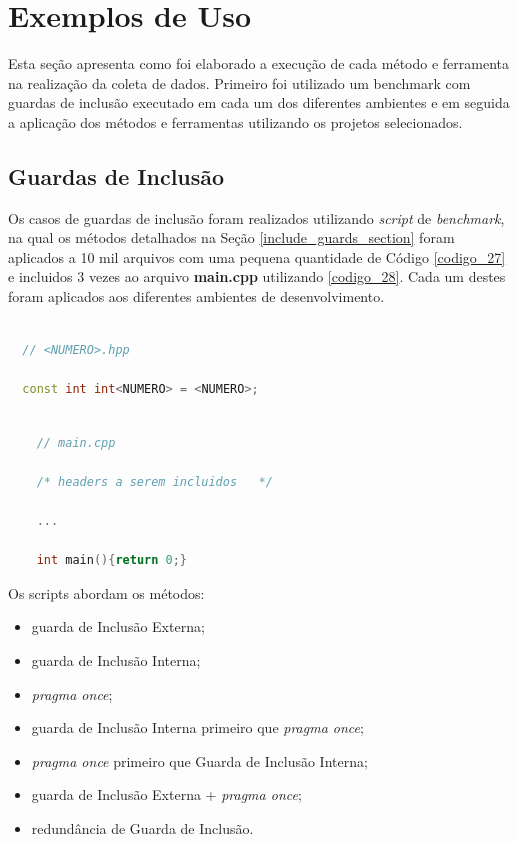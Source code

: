 \section {Exemplos de Uso}
\label{exemplos_de_uso}

	Esta seção apresenta como foi elaborado a execução
 de cada método e ferramenta na realização da coleta de dados.
Primeiro foi utilizado um benchmark com guardas de inclusão
 executado em cada um dos diferentes ambientes e
 em seguida a aplicação dos métodos e ferramentas utilizando
 os projetos selecionados.

\subsection{Guardas de Inclusão}

Os casos de guardas de inclusão foram realizados utilizando \textit{script} de \textit{benchmark},
 na qual os métodos detalhados na Seção \ref{include_guards_section} foram
 aplicados a 10 mil arquivos com uma pequena quantidade de Código
 \ref{codigo_27} e incluidos 3 vezes ao arquivo \textbf{main.cpp} utilizando
 \ref{codigo_28}. Cada um destes foram aplicados aos diferentes ambientes de
 desenvolvimento.

\begin{lstlisting}[language=C++,caption={Template de arquivo .hpp utilizado no \textit{benchmark}},
                                                   label=codigo_27]

  // <NUMERO>.hpp

  const int int<NUMERO> = <NUMERO>;

\end{lstlisting}

\begin{lstlisting}[language=C++,caption={Template de arquivo main.cpp utilizado no \textit{benchmark}},
                                                          label=codigo_28]

    // main.cpp

    /* headers a serem incluidos   */

    ...

    int main(){return 0;}
\end{lstlisting}

Os scripts abordam os métodos:

\begin{itemize}
	\item guarda de Inclusão Externa;
	\item guarda de Inclusão Interna;
	\item \textit{pragma once};
	\item guarda de Inclusão Interna primeiro que \textit{pragma once};
	\item \textit{pragma once} primeiro que  Guarda de Inclusão Interna;
	\item guarda de Inclusão Externa + \textit{pragma once};
	\item redundância de Guarda de Inclusão.
\end{itemize}

